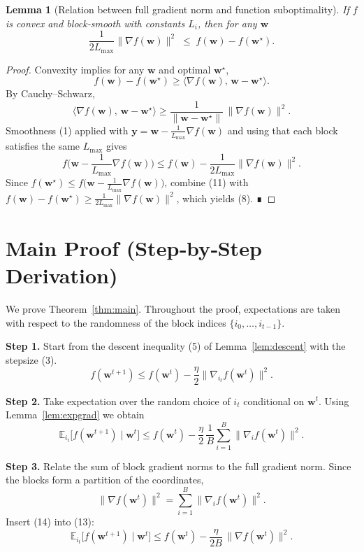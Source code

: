 \documentclass{article}
\newtheorem{lemma}{Lemma}
\newcommand{\E}{\mathbb{E}}
\begin{document}
\begin{lemma}[Relation between full gradient norm and function suboptimality]\label{lem:gradbound}
If $f$ is convex and block‑smooth with constants $L_i$, then for any $\bm w$
\[
\frac{1}{2L_{\max}}\|\nabla f(\bm w)\|^{2}
\;\le\;
f(\bm w)-f(\bm w^{\star}).
\tag{8}
\]
\end{lemma}
\begin{proof}
Convexity implies for any $\bm w$ and optimal $\bm w^{\star}$,
\[
f(\bm w)-f(\bm w^{\star})\ge \langle \nabla f(\bm w),\,
\bm w-\bm w^{\star}\rangle .
\tag{9}
\]
By Cauchy–Schwarz,
\[
\langle \nabla f(\bm w),\,
\bm w-\bm w^{\star}\rangle
\ge \frac{1}{\|\bm w-\bm w^{\star}\|}\,
\|\nabla f(\bm w)\|^{2}.
\tag{10}
\]
Smoothness (1) applied with $\bm y=\bm w-\frac{1}{L_{\max}}\nabla f(\bm w)$
and using that each block satisfies the same $L_{\max}$ gives
\[
f\!\Big(\bm w-\frac{1}{L_{\max}}\nabla f(\bm w)\Big)
\le f(\bm w)-\frac{1}{2L_{\max}}\|\nabla f(\bm w)\|^{2}.
\tag{11}
\]
Since $f(\bm w^{\star})\le f\big(\bm w-\frac{1}{L_{\max}}\nabla f(\bm w)\big)$,
combine (11) with $f(\bm w)-f(\bm w^{\star})\ge\frac{1}{2L_{\max}}\|\nabla f(\bm w)\|^{2}$,
which yields (8). ∎
\end{proof}

\vspace{0.5em}
\section*{Main Proof (Step‑by‑Step Derivation)}
We prove Theorem~\ref{thm:main}. Throughout the proof, expectations are taken
with respect to the randomness of the block indices $\{i_0,\dots,i_{t-1}\}$.

\noindent\textbf{Step 1.}  Start from the descent inequality (5) of Lemma~\ref{lem:descent}
with the stepsize (3).  
\[
f(\bm w^{t+1})
\le f(\bm w^{t})-\frac{\eta}{2}\|\nabla_{i_t}f(\bm w^{t})\|^{2}.
\tag{12}
\]

\noindent\textbf{Step 2.}  Take expectation over the random choice of $i_t$ conditional on $\bm w^{t}$.  
Using Lemma~\ref{lem:expgrad} we obtain
\[
\E_{i_t}\!\big[f(\bm w^{t+1})\mid \bm w^{t}\big]
\le f(\bm w^{t})-\frac{\eta}{2}\,
\frac{1}{B}\sum_{i=1}^{B}\|\nabla_{i}f(\bm w^{t})\|^{2}.
\tag{13}
\]

\noindent\textbf{Step 3.}  Relate the sum of block gradient norms to the full gradient norm.
Since the blocks form a partition of the coordinates,
\[
\|\nabla f(\bm w^{t})\|^{2}
=\sum_{i=1}^{B}\|\nabla_{i}f(\bm w^{t})\|^{2}.
\tag{14}
\]
Insert (14) into (13):
\[
\E_{i_t}\!\big[f(\bm w^{t+1})\mid \bm w^{t}\big]
\le f(\bm w^{t})-\frac{\eta}{2B}\,\|\nabla f(\bm w^{t})\|^{2}.
\tag{15}
\]
\end{document}
